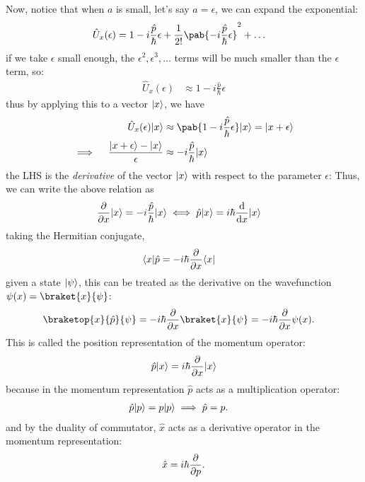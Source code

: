 Now, notice that when $a$ is small, let's say $a = \epsilon$, we can expand the exponential:
\begin{align}
  \hat{U}_x (\epsilon) & = 1 - i \frac{\hat{p}}{\hbar} \epsilon + \frac{1}{2!} \pab{- i \frac{\hat{p}}{\hbar} \epsilon}^2 + \ldots
\end{align}
if we take $\epsilon$ small enough, the $\epsilon^2, \epsilon^3, \ldots$ terms will be much smaller than the $\epsilon$ term, so:
\begin{align}
  \hat{U}_x (\epsilon) & \approx 1 - i \frac{\hat{p}}{\hbar} \epsilon
\end{align}
thus by applying this to a vector $\lvert x\rangle$, we have
\begin{align}
  \hat{U}_x (\epsilon) \ket{x}                                 & \approx \pab{1 - i \frac{\hat{p}}{\hbar} \epsilon} \ket{x} = \ket{x + \epsilon} \\
  \implies \quad \frac{\ket{x + \epsilon} - \ket{x}}{\epsilon} & \approx - i \frac{\hat{p}}{\hbar} \ket{x}
\end{align}
the LHS is the \emph{derivative} of the vector $\lvert x\rangle$ with respect to the parameter $\epsilon$:
Thus, we can write the above relation as
\begin{align}
  \pdv{}{x} \ket{x} & = - i \frac{\hat{p}}{\hbar} \ket{x} \iff \hat{p} \ket{x} = i \hbar \odv{}{x} \ket{x}
\end{align}
taking the Hermitian conjugate,
\begin{align}
  \langle x\rvert \hat{p} & = - i \hbar \pdv{}{x} \langle x\rvert
\end{align}
given a state $\lvert\psi\rangle$, this can be treated as the derivative on the wavefunction $\psi(x) = \braket{x}{\psi}$:
\begin{align}
  \braketop{x}{\hat{p}}{\psi} & = - i \hbar \pdv{}{x} \braket{x}{\psi} = - i \hbar \pdv{}{x} \psi(x).
\end{align}
This is called the position representation of the momentum operator:
\begin{align}
  \hat{p} \lvert x\rangle = i \hbar \pdv{}{x} \lvert x\rangle
\end{align}
because in the momentum representation $\hat{p}$ acts as a multiplication operator:
\begin{align}
  \hat{p} \lvert p\rangle & = p \lvert p\rangle \implies \hat{p} = p.
\end{align}
and by the duality of commutator, $\hat{x}$ acts as a derivative operator in the momentum representation:
\begin{align}
  \hat{x} = i \hbar \pdv{}{p}.
\end{align}

